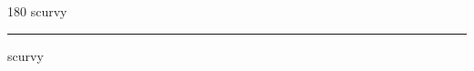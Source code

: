 
\begin{frame}
\begin{center}
\begin{turn}{180}
{\fontsize{2.5cm}{1em}\selectfont scurvy}
\end{turn}
\vspace{1em}\par  
\hrule
\vspace{1em}\par  
{\fontsize{2.5cm}{1em}\selectfont scurvy}
\end{center}
\end{frame}
